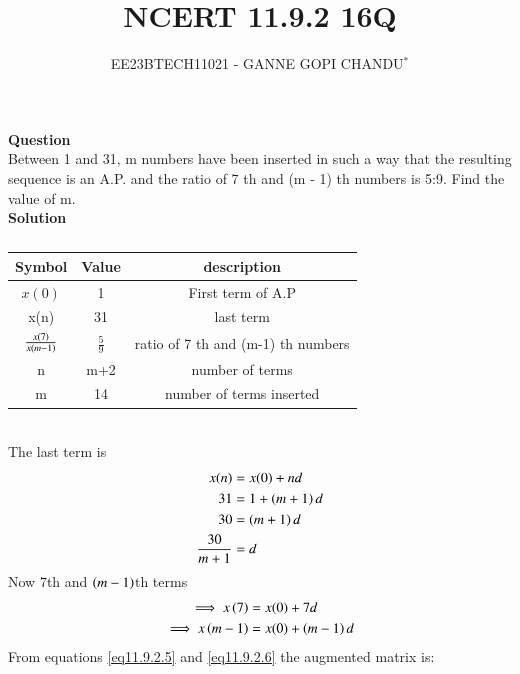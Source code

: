 \documentclass[journal,12pt,twocolumn]{IEEEtran}
\theoremstyle{remark}
\begin{document}

\vspace{3cm}
\title{NCERT 11.9.2 16Q}
\author{EE23BTECH11021 - GANNE GOPI CHANDU$^{*}$%
}
\maketitle
\newpage
\bigskip
\renewcommand{\thefigure}{\theenumi}
\renewcommand{\thetable}{\theenumi}

\textbf{Question}\\
Between 1 and 31, m numbers have been inserted in such a way that the resulting sequence is an A.P. and 
the ratio of 7
th and (m - 1)
th numbers is 5:9. Find the value of m.\\
\textbf{Solution}\\
\begin{table}[!h]
\begin{center}
\renewcommand\thetable{1}
\begin{tabular}{ |c|c|c| } 
  \hline
    Symbol & Value & description \\ 
  \hline
  $x(0)$ & 1 & First term of A.P  \\ 
  \hline
  x(n) & 31 & last term \\
  \hline
  $\frac{x\left(7\right)}{x\left(m-1\right)}$ & $\frac{5}{9}$ & ratio of 7 th and (m-1) th numbers\\ 
  \hline
  n & m+2 & number of terms \\
  \hline
  m & 14 & number of terms inserted \\
  \hline
\end{tabular}
\end{center}
\caption{}
\end{table}\\
The last term is
\begin{align}
x(n)&=x(0)+nd\\
31 &= 1 + \left(m + 1\right)d \\
30 &= \left(m + 1\right)d \\
\frac{30}{m + 1} &= d \label{eq11.9.2.4}
\end{align}
Now $7$th and $\left(m-1\right)$th terms
\begin{align}
\implies x\left(7\right) &= x(0) + 7d\label{eq11.9.2.5}\\
\implies x\left(m-1\right) &= x(0) + \left(m-1\right)d\label{eq11.9.2.6}
\end{align}
From  equations \eqref{eq11.9.2.5} and \eqref{eq11.9.2.6} the augmented matrix is:\\
\end{document}
